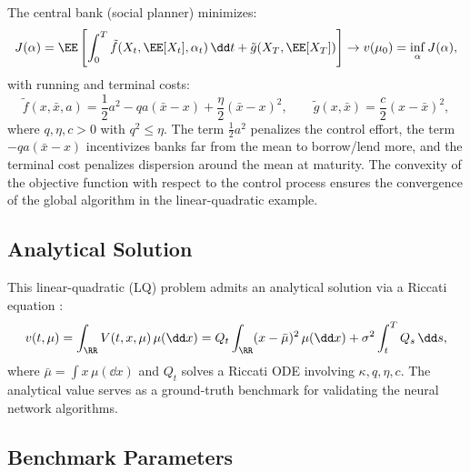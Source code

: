\documentclass[11pt]{article}
\begin{document}
The central bank (social planner) minimizes:
\begin{equation}\label{eq:systemic-cost}
  J(\alpha) = \EE\left[\int_0^T \tilde{f}(X_t, \EE[X_t], \alpha_t)\,\dd t + \tilde{g}(X_T, \EE[X_T])\right] \to v(\mu_0) = \inf_\alpha J(\alpha),
\end{equation}
with running and terminal costs:
\begin{equation}\label{eq:systemic-costs-detail}
  \tilde{f}(x, \bar{x}, a) = \frac{1}{2}a^2 - qa(\bar{x} - x) + \frac{\eta}{2}(\bar{x} - x)^2, \qquad \tilde{g}(x, \bar{x}) = \frac{c}{2}(x - \bar{x})^2,
\end{equation}
where $q, \eta, c > 0$ with $q^2 \le \eta$. The term $\frac{1}{2}a^2$ penalizes the control effort, the term $-qa(\bar{x} - x)$ incentivizes banks far from the mean to borrow/lend more, and the terminal cost penalizes dispersion around the mean at maturity. The convexity of the objective function with respect to the control process ensures the convergence of the global algorithm in the linear-quadratic example.

\subsection{Analytical Solution}

This linear-quadratic (LQ) problem admits an analytical solution via a Riccati equation \citep{carmona2018mfg1}:
\begin{equation}\label{eq:systemic-value}
  v(t, \mu) = \int_{\RR} V(t, x, \mu)\,\mu(\dd x) = Q_t \int_{\RR} (x - \bar{\mu})^2\,\mu(\dd x) + \sigma^2 \int_t^T Q_s\,\dd s,
\end{equation}
where $\bar{\mu} = \int x\,\mu(\dd x)$ and $Q_t$ solves a Riccati ODE involving $\kappa, q, \eta, c$. The analytical value serves as a ground-truth benchmark for validating the neural network algorithms.

\subsection{Benchmark Parameters}
\end{document}
